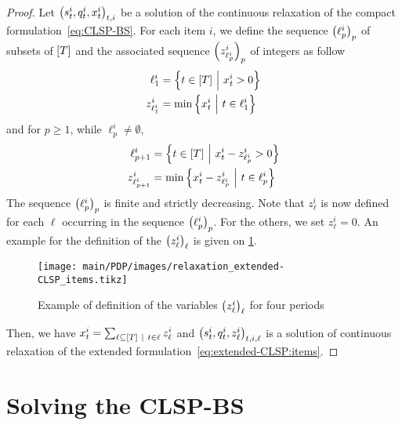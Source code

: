 \begin{proof}
Let $\bracket{\inventory_t^i, \quantity_t^i, \setup_t^i}_{t,i}$ be a solution of the continuous relaxation of the compact formulation~\eqref{eq:CLSP-BS}.
For each item $i$, we define the sequence $\bracket{\ell_p^i}_p$ of subsets of $\range{\horizon}$ and the associated sequence $\bracket{z_{\ell_p^i}^i}_p$ of integers as follow
\begin{equation}
  \begin{aligned}
  \ell_1^i       &= \crbracket{t\in\range{\horizon}~\Big|~\setup_t^i>0} \\
  z_{\ell_1^i}^i &= \min\crbracket{\setup_t^i~\Big|~t\in\ell_1^i}
  \end{aligned}
\end{equation}
and for $p\ge1$, while $\ell_p^i\ne\emptyset$,
\begin{equation}
  \begin{aligned}
  \ell_{p+1}^i       &= \crbracket{t\in\range{\horizon}~\Big|~\setup_t^i-z_{\ell_p^i}^i>0} \\
  z_{\ell_{p+1}^i}^i &= \min\crbracket{\setup_t^i-z_{\ell_p^i}^i~\Big|~t\in\ell_p^i}
  \end{aligned}
\end{equation}
The sequence $\bracket{\ell_p^i}_p$ is finite and strictly decreasing.
Note that $z_{\ell}^i$ is now defined for each $\ell$ occurring in the sequence $\bracket{\ell_p^i}_p$.
For the others, we set $z_{\ell}^i=0$.
An example for the definition of the $\bracket{z_{\ell}^i}_{\ell}$ is given on \cref{fig:relaxation-extended-formulation-by-reference}.

\begin{figure}[h]
  \centering
  \texttt{[image: main/PDP/images/relaxation\_extended-CLSP\_items.tikz]}
  \caption{Example of definition of the variables $\bracket{z_{\ell}^i}_{\ell}$ for four periods}
  \label{fig:relaxation-extended-formulation-by-reference}
\end{figure}

Then, we have $\setup_t^i = \sum_{\ell\subseteq\range{\horizon}~|~t\in\ell} z_{\ell}^i$ and $\bracket{\inventory_t^i, \quantity_t^i, z_{\ell}^i}_{t,i,\ell}$ is a solution of continuous relaxation of the extended formulation~\eqref{eq:extended-CLSP:items}.
\end{proof}




\section{Solving the CLSP-BS}
\label{sec:PDP:deterministic:solving}


